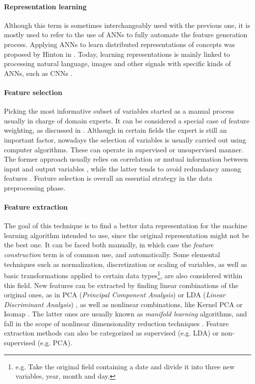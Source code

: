 \documentclass[preprint,5p,compress]{elsarticle}
\begin{document}
    \paragraph{Representation learning \cite{bengio_representation_2013}}
    Although this term is sometimes interchangeably used with the previous one, it is mostly used to refer to the use of ANNs to fully automate the feature generation process. Applying ANNs to learn distributed representations of concepts was proposed by Hinton in \cite{DistributedRepresentations}. Today, learning representations is mainly linked to processing natural language, images and other signals with specific kinds of ANNs, such as CNNs \cite{CNNs}.
  
    \paragraph{Feature selection \cite{DataPreprocessing}} 
    Picking the most informative subset of variables started as a manual process usually in charge of domain experts. It can be considered a special case of feature weighting, as discussed in \cite{FeatureWeighting}. Although in certain fields the expert is still an important factor, nowadays the selection of variables is usually carried out using computer algorithms. These can operate in supervised or unsupervised manner. The former approach usually relies on correlation or mutual information between input and output variables \cite{CorrelationFS,MutualInformationDS}, while the latter tends to avoid redundancy among features \cite{UnsupervisedFS}. Feature selection is overall an essential strategy in the data preprocessing \cite{PreprocTutorial, DataPreprocessing} phase.
    
    \paragraph{Feature extraction \cite{FeatureExtractionIntro}} 
    The goal of this technique is to find a better data representation for the machine learning algorithm intended to use, since the original representation might not be the best one. It can be faced both manually, in which case the \textit{feature construction} term is of common use, and automatically. Some elemental techniques such as normalization, discretization or scaling of variables, as well as basic transformations applied to certain data types\footnote{e.g. Take the original field containing a date and divide it into three new variables, year, month and day.}, are also considered within this field. New features can be extracted by finding linear combinations of the original ones, as in PCA (\textit{Principal Component Analysis}) \cite{PCA,PCAHotelling} or LDA (\textit{Linear Discriminant Analysis}) \cite{LDA}, as well as nonlinear combinations, like Kernel PCA \cite{KernelPCA}  or Isomap \cite{Isomap}. The latter ones are usually known as \textit{manifold learning} \cite{ManifoldLearning} algorithms, and fall in the scope of nonlinear dimensionality reduction techniques \cite{NonlinearDimRec}. Feature extraction methods can also be categorized as supervised (e.g. LDA) or non-supervised (e.g. PCA).
    
\end{document}
